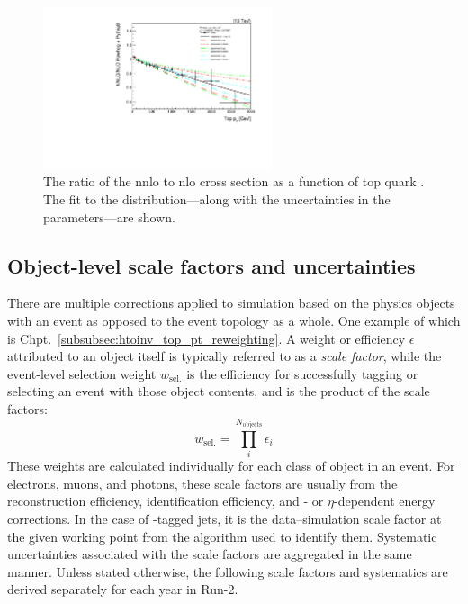 \begin{figure}[htbp]
    \centering
    \includegraphics[width=0.6\textwidth]{figures/top_pt_reweighting/top_pt_reweighting_central.pdf}
    \caption[The ratio of the NNLO to NLO \ttbar cross section as a function of top quark \pt. The fit to the distribution---along with the uncertainties in the parameters---are shown]{The ratio of the \acrshort{nnlo} to \acrshort{nlo} \ttbar cross section as a function of top quark \pt. The fit to the distribution---along with the uncertainties in the parameters---are shown.}
    \label{fig:top_pt_reweighting}
\end{figure}





\subsection{Object-level scale factors and uncertainties}
\label{subsec:htoinv_SFs_systs_objects}

There are multiple corrections applied to simulation based on the physics objects with an event as opposed to the event topology as a whole. One example of which is Chpt.~\ref{subsubsec:htoinv_top_pt_reweighting}. A weight or efficiency $\epsilon$ attributed to an object itself is typically referred to as a \emph{scale factor}, while the event-level selection weight $w_{\mathrm{sel.}}$ is the efficiency for successfully tagging or selecting an event with those object contents, and is the product of the scale factors:
\begin{equation}
    w_{\mathrm{sel.}} = \prod_i^{N_\mathrm{objects}} \epsilon_i
    \label{eq:event_selection_weight}
\end{equation}
These weights are calculated individually for each class of object in an event. For electrons, muons, and photons, these scale factors are usually from the reconstruction efficiency, identification efficiency, and \pt- or $\eta$-dependent energy corrections. In the case of \Pbottom-tagged \glspl{jet}, it is the data--simulation scale factor at the given working point from the algorithm used to identify them. Systematic uncertainties associated with the scale factors are aggregated in the same manner. Unless stated otherwise, the following scale factors and systematics are derived separately for each year in Run-2.



